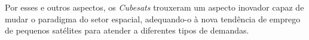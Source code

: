 \noindent
\begin{minipage}{\linewidth}
\label{cubesat1U_dimensions_fig}
\end{minipage}

Por esses e outros aspectos, os \textit{Cubesats} trouxeram um aspecto inovador capaz de mudar o paradigma do setor espacial, adequando-o à nova tendência de emprego de pequenos satélites para atender a diferentes tipos de demandas.




